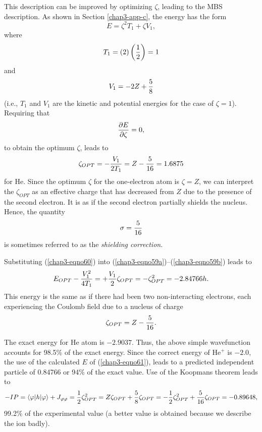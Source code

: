This description can be improved by optimizing $\zeta$, leading to the
MBS description.  As shown in Section \ref{chap3-app-c}, the energy
has the form
\begin{equation}
E = \zeta^2 T_1 + \zeta V_1 ,
\end{equation}
where
\begin{equation}
T_1 = (2) \left( {1 \over 2} \right) = 1
\end{equation}
and
\begin{equation}
V_1 = - 2 Z + {5 \over 8}
\end{equation}
(i.e., $T_1$ and $V_1$ are the kinetic and potential energies for the
case of $\zeta = 1$).  Requiring that
\begin{equation}
{\partial E \over \partial \zeta} = 0 ,
\end{equation}
to obtain the optimum $\zeta$, leads to
\begin{equation}
\zeta_{OPT} = - {V_1 \over 2T_1} = Z - {5 \over 16} = 1.6875
\label{chap3-eqno60}
\end{equation}
for He. Since the optimum $\zeta$ for the one-electron atom is $\zeta
= Z$, we can interpret the $\zeta_{OPT}$ as an effective charge that
has decreased from $Z$ due to the presence of the second electron.  It
is as if the second electron partially shields the nucleus.  Hence,
the quantity
\begin{equation}
\sigma = {5 \over 16}
\end{equation}
is sometimes referred to as the \emph{shielding correction}.

Substituting (\ref{chap3-eqno60}) into
(\ref{chap3-eqno59a})--(\ref{chap3-eqno59b}) leads to
\begin{equation}
E_{OPT}  - {V^2_1 \over 4T_1} = + {V_1 \over 2} \zeta_{OPT} = - 
\zeta^2_{OPT}  = -2.84766h.
\label{chap3-eqno61}
\end{equation}
This energy is the same as if there had been two non-interacting electrons, 
each experiencing the Coulomb field due to a nucleus of charge
\begin{equation}
\zeta_{OPT} = Z - {5 \over 16} .
\end{equation}

The exact energy for He atom is $-2.9037$.  Thus, the above simple
wavefunction accounts for 98.5\% of the exact energy. Since the
correct energy of He$^+$ is $-2.0$, the use of the calculated $E$ of
(\ref{chap3-eqno61}), leads to a predicted independent particle of
0.84766 or 94\% of the exact value. Use of the Koopmans theorem leads
to
\begin{equation}
- IP = \langle \varphi \vert h \vert \varphi \rangle + J_{\varphi \varphi} = {1 
\over 2} \zeta^2_{OPT} = Z \zeta_{OPT} + {5 \over 8} \zeta_{OPT} = - 
{1 \over 2} \zeta^2_{OPT} + {5 \over 16} \zeta_{OPT} = - 0.89648 ,
\end{equation}
99.2\% of the experimental value (a better value is obtained because
we describe the ion badly).

